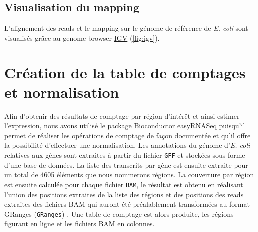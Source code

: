 \documentclass[12pt,a4paper]{report}
\begin{document}
\begin{onehalfspace}
\subsection*{Visualisation du mapping}
L'alignement des reads et le mapping sur le génome de référence de \textit{E. coli} sont visualisés grâce au genome browser \href{https://www.broadinstitute.org/igv/}{IGV} \citep{Robinson2011,Thorvaldsdottir2013} (\autoref{fig:igv}).

\begin{figure}
\end{figure}

\section*{Création de la table de comptages et normalisation}
Afin d'obtenir des résultats de comptage par région d'intérêt et ainsi estimer l'expression, nous avons utilisé le package Bioconductor easyRNASeq \citep{Delhomme2012} puisqu'il permet de réaliser les opérations de comptage de façon documentée et qu'il offre la possibilité d'effectuer une normalisation. Les annotations du génome d'\textit{E. coli} relatives aux gènes sont extraites à partir du fichier \texttt{GFF} et stockées sous forme d'une base de données.
La liste des transcrits par gène est ensuite extraite pour un total de 4605 éléments que nous nommerons régions. La couverture par région est ensuite calculée pour chaque fichier \texttt{BAM}, le résultat est obtenu en réalisant l'union des positions extraites de la liste des régions et des positions des reads extraites des fichiers BAM qui auront été préalablement transformées au format \gls{GRanges} (\texttt{GRanges})  \citep{Lawrence2013}. Une table de comptage est alors produite, les régions figurant en ligne et les fichiers BAM en colonnes.


\end{onehalfspace}
\end{document}
